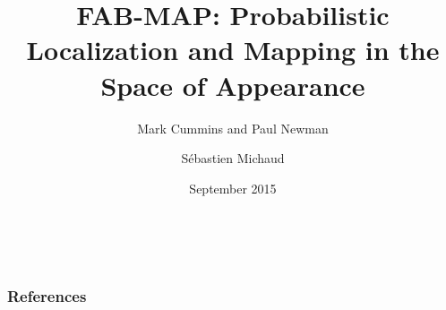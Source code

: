 \documentclass[[aspectratio=169,14pt,t]{beamer}
\title[FAB-MAP]{FAB-MAP: Probabilistic Localization and Mapping in the Space of Appearance}
\subtitle{Mark Cummins and Paul Newman}
\author{Sébastien Michaud}
\institute{Laval University}
\date{September 2015}
\begin{document}
\begin{frame}
    \titlepage
    \\
\end{frame}



\begin{frame}[allowframebreaks]
    \frametitle{References}
    \def\newblock{\hskip .11em plus .33em minus .07em} %
    \small
    \nocite{*}
    
    
\end{frame}
\end{document}
